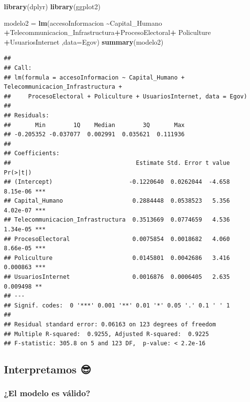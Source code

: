 \documentclass[
]{article}
\newenvironment{Shaded}{\begin{snugshade}}{\end{snugshade}}
\newcommand{\AttributeTok}[1]{\textcolor[rgb]{0.13,0.29,0.53}{#1}}
\newcommand{\FunctionTok}[1]{\textcolor[rgb]{0.13,0.29,0.53}{\textbf{#1}}}
\newcommand{\NormalTok}[1]{#1}
\newcommand{\OtherTok}[1]{\textcolor[rgb]{0.56,0.35,0.01}{#1}}
\newcommand{\SpecialCharTok}[1]{\textcolor[rgb]{0.81,0.36,0.00}{\textbf{#1}}}
\begin{document}
\begin{Shaded}
\begin{Highlighting}[]
\FunctionTok{library}\NormalTok{(dplyr)}
\FunctionTok{library}\NormalTok{(ggplot2)}

\NormalTok{modelo2 }\OtherTok{=} \FunctionTok{lm}\NormalTok{(accesoInformacion }\SpecialCharTok{\textasciitilde{}}\NormalTok{Capital\_Humano  }\SpecialCharTok{+}\NormalTok{Telecommunicacion\_Infrastructura}\SpecialCharTok{+}\NormalTok{ProcesoElectoral}\SpecialCharTok{+}\NormalTok{ Policulture }\SpecialCharTok{+}\NormalTok{UsuariosInternet   ,}\AttributeTok{data=}\NormalTok{Egov)}
\FunctionTok{summary}\NormalTok{(modelo2)}
\end{Highlighting}
\end{Shaded}

\begin{verbatim}
## 
## Call:
## lm(formula = accesoInformacion ~ Capital_Humano + Telecommunicacion_Infrastructura + 
##     ProcesoElectoral + Policulture + UsuariosInternet, data = Egov)
## 
## Residuals:
##       Min        1Q    Median        3Q       Max 
## -0.205352 -0.037077  0.002991  0.035621  0.111936 
## 
## Coefficients:
##                                    Estimate Std. Error t value Pr(>|t|)    
## (Intercept)                      -0.1220640  0.0262044  -4.658 8.15e-06 ***
## Capital_Humano                    0.2884448  0.0538523   5.356 4.02e-07 ***
## Telecommunicacion_Infrastructura  0.3513669  0.0774659   4.536 1.34e-05 ***
## ProcesoElectoral                  0.0075854  0.0018682   4.060 8.66e-05 ***
## Policulture                       0.0145801  0.0042686   3.416 0.000863 ***
## UsuariosInternet                  0.0016876  0.0006405   2.635 0.009498 ** 
## ---
## Signif. codes:  0 '***' 0.001 '**' 0.01 '*' 0.05 '.' 0.1 ' ' 1
## 
## Residual standard error: 0.06163 on 123 degrees of freedom
## Multiple R-squared:  0.9255, Adjusted R-squared:  0.9225 
## F-statistic: 305.8 on 5 and 123 DF,  p-value: < 2.2e-16
\end{verbatim}

\subsection{\texorpdfstring{\textbf{Interpretamos
😎}}{Interpretamos 😎}}\label{interpretamos-1}

\subsubsection{\texorpdfstring{\textbf{¿El modelo es
válido?}}{¿El modelo es válido?}}\label{el-modelo-es-vuxe1lido-1}
\end{document}
